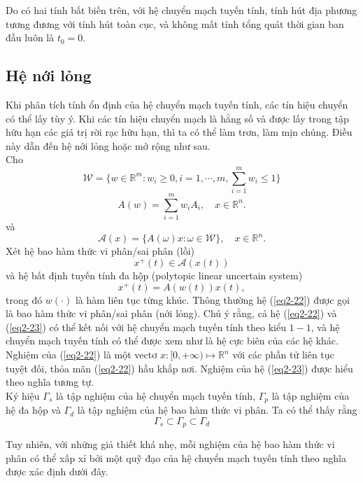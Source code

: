 \documentclass[14pt,a4paper,oneside]{report}		%
\begin{document}
Do có hai tính bất biến trên, với hệ chuyển mạch tuyến tính, tính hút địa phương tương đương với tính hút toàn cục, và không mất tính tổng quát thời gian ban đầu luôn là $t_0 = 0$.

\subsection{Hệ nới lỏng}
Khi phân tích tính ổn định của hệ chuyển mạch tuyến tính, các tín hiệu chuyển có thể lấy tùy ý. Khi các tín hiệu chuyển mạch là hằng số và được lấy trong tập hữu hạn các giá trị rời rạc hữu hạn, thì ta có thể làm trơn, làm mịn chúng. Điều này dẫn đến hệ nới lỏng hoặc mở rộng như sau.\\

Cho
$$\mathcal{W} = \{ w\in\mathbb{R}^m:w_i \geq 0,  i=1,\cdots ,m,\sum_{i=1}^m w_i \leq 1 \}$$
\begin{equation} \label{2-20}
A(w) = \sum_{i=1}^m w_iA_i,\quad x\in\mathbb{R}^n.
\end{equation}
và
\begin{equation} \label{eq2-21}
\mathcal{A}(x)=\{A(\omega)x:\omega\in\mathcal{W}\},\quad x\in\mathbb{R}^n.
\end{equation}
Xét hệ bao hàm thức vi phân/sai phân (lồi)
\begin{equation} \label{eq2-22}
x^+(t)\in\mathcal{A}(x(t))
\end{equation}
và hệ bất định tuyến tính đa hộp (polytopic linear uncertain system)
\begin{equation} \label{eq2-23}
x^+(t)=A(w(t))x(t),
\end{equation}
trong đó $w(\cdot)$ là hàm liên tục từng khúc. Thông thường hệ (\ref{eq2-22}) được gọi là bao hàm thức vi phân/sai phân (nới lỏng). Chú ý rằng, cả hệ (\ref{eq2-22}) và (\ref{eq2-23}) có thể kết nối với hệ chuyển mạch tuyến tính theo kiểu $1-1$, và hệ chuyển mạch tuyến tính có thể được xem như là hệ cực biên của các hệ khác.\\
Nghiệm của (\ref{eq2-22}) là một vectơ $x:[0,+\infty)\mapsto\mathbb{R}^n$ với các phần tử liên tục tuyệt đối, thỏa mãn (\ref{eq2-22}) hầu khắp nơi. Nghiệm của hệ (\ref{eq2-23}) được hiểu theo nghĩa tương tự.\\
Ký hiệu $\Gamma_s$ là tập nghiệm của hệ chuyển mạch tuyến tính, $\Gamma_p$ là tập nghiệm của hệ đa hộp và $\Gamma_d$ là tập nghiệm của hệ bao hàm thức vi phân. Ta có thể thấy rằng 
$$\Gamma_s\subset\Gamma_p\subset\Gamma_d$$

Tuy nhiên, với những giả thiết khá nhẹ, mỗi nghiệm của hệ bao hàm thức vi phân có thể xấp xỉ bởi một quỹ đạo của hệ chuyển mạch tuyến tính theo nghĩa được xác định dưới đây.
\end{document}
